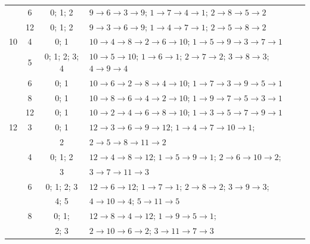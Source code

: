 \documentclass[12pt,a4paper]{article}
\theoremstyle{remark} %
\theoremstyle{example} %
\theoremstyle{proposition}
\begin{document}
\begin{longtable}{|c|c|c|l|}
& 6 & 0; 1; 2 & $9 \rightarrow 6 \rightarrow 3 \rightarrow 9$; $1 \rightarrow 7 \rightarrow 4 \rightarrow 1$; $2 \rightarrow 8 \rightarrow 5 \rightarrow 2$ \\
& 12 & 0; 1; 2 & $9 \rightarrow 3 \rightarrow 6 \rightarrow 9$; $1 \rightarrow 4 \rightarrow 7 \rightarrow 1$; $2 \rightarrow 5 \rightarrow 8 \rightarrow 2$ \\
\midrule
10 & 4 & 0; 1 & $10 \rightarrow 4 \rightarrow 8 \rightarrow 2 \rightarrow 6 \rightarrow 10$; $1 \rightarrow 5 \rightarrow 9 \rightarrow 3 \rightarrow 7 \rightarrow 1$ \\
& 5 & 0; 1; 2; 3; 4 & $10 \rightarrow 5 \rightarrow 10$; $1 \rightarrow 6 \rightarrow 1$; $2 \rightarrow 7 \rightarrow 2$; $3 \rightarrow 8 \rightarrow 3$; $4 \rightarrow 9 \rightarrow 4$ \\
& 6 & 0; 1 & $10 \rightarrow 6 \rightarrow 2 \rightarrow 8 \rightarrow 4 \rightarrow 10$; $1 \rightarrow 7 \rightarrow 3 \rightarrow 9 \rightarrow 5 \rightarrow 1$ \\
& 8 & 0; 1 & $10 \rightarrow 8 \rightarrow 6 \rightarrow 4 \rightarrow 2 \rightarrow 10$; $1 \rightarrow 9 \rightarrow 7 \rightarrow 5 \rightarrow 3 \rightarrow 1$ \\
& 12 & 0; 1 & $10 \rightarrow 2 \rightarrow 4 \rightarrow 6 \rightarrow 8 \rightarrow 10$; $1 \rightarrow 3 \rightarrow 5 \rightarrow 7 \rightarrow 9 \rightarrow 1$ \\
\midrule
12 & 3 & 0; 1 & $12 \rightarrow 3 \rightarrow 6 \rightarrow 9 \rightarrow 12$; $1 \rightarrow 4 \rightarrow 7 \rightarrow 10 \rightarrow 1$;  \\
 &  & 2 & $2 \rightarrow 5 \rightarrow 8 \rightarrow 11 \rightarrow 2$\\
& 4 & 0; 1; 2 & $12 \rightarrow 4 \rightarrow 8 \rightarrow 12$; $1 \rightarrow 5 \rightarrow 9 \rightarrow 1$; $2 \rightarrow 6 \rightarrow 10 \rightarrow 2$;  \\
&  & 3 &  $3 \rightarrow 7 \rightarrow 11 \rightarrow 3$ \\
& 6 & 0; 1; 2; 3 & $12 \rightarrow 6 \rightarrow 12$; $1 \rightarrow 7 \rightarrow 1$; $2 \rightarrow 8 \rightarrow 2$; $3 \rightarrow 9 \rightarrow 3$; \\
&  & 4; 5 & $4 \rightarrow 10 \rightarrow 4$; $5 \rightarrow 11 \rightarrow 5$ \\
& 8 & 0; 1; & $12 \rightarrow 8 \rightarrow 4 \rightarrow 12$; $1 \rightarrow 9 \rightarrow 5 \rightarrow 1$; \\
&  & 2; 3 & $2 \rightarrow 10 \rightarrow 6 \rightarrow 2$; $3 \rightarrow 11 \rightarrow 7 \rightarrow 3$ \\

\end{longtable}
\end{document}
